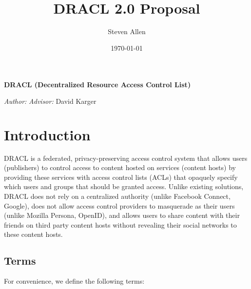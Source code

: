 \documentclass[pdftex,12pt,a4papaer]{report}
\title{DRACL 2.0 Proposal}
\author{Steven Allen}
\date{\today}
\begin{document}
\thispagestyle{plain}

\begin{center}
    \vspace*{\fill}
    {%
        \onehalfspacing{} \bfseries \Large
        DRACL (Decentralized Resource Access Control List) \\
    }

    \vspace{\fill}
    {\large
    \begin{minipage}{0.9\textwidth}
        \emph{Author:} \theauthor{} \hfill \emph{Advisor:} David Karger
        \\
        \begin{center}
              \thedate{}
        \end{center}
    \end{minipage}
    }
    \vspace*{\fill}
\end{center}

\tableofcontents

\newpage

\chapter{Introduction} 

DRACL is a federated, privacy-preserving access control system that allows users
(publishers) to control access to content hosted on services (content hosts)
by providing these services with access control lists (ACLs) that opaquely
specify which users and groups that should be granted access. Unlike existing
solutions, DRACL does not rely on a centralized authority (unlike Facebook
Connect, Google), does not allow access control providers to masquerade as their
users (unlike Mozilla Persona, OpenID), and allows users to share content with
their friends on third party content hosts without revealing their social
networks to these content hosts.

\section{Terms}

For convenience, we define the following terms:
\end{document}
